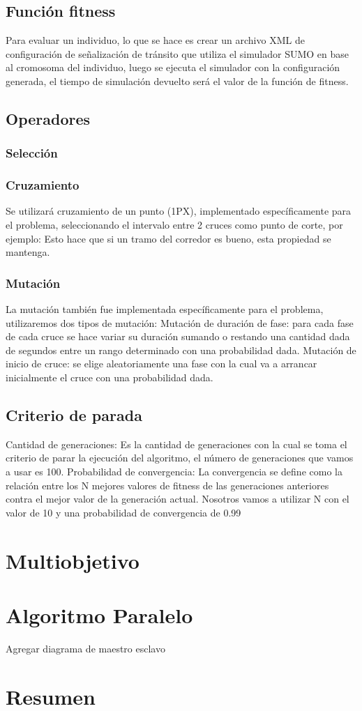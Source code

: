 \subsection{Función fitness}
Para evaluar un individuo, lo que se hace es crear un archivo
XML  de configuración de señalización de tránsito que utiliza
el  simulador  SUMO  en  base  al  cromosoma  del  individuo,
luego se ejecuta el simulador con la configuración generada, el
tiempo de simulación devuelto será el valor de la función de
fitness.

\subsection{Operadores}
\subsubsection{Selección}
\subsubsection{Cruzamiento}
Se  utilizará  cruzamiento  de  un  punto  (1PX),  implementado
específicamente  para  el  problema,  seleccionando  el  intervalo
entre 2 cruces como punto de corte, por ejemplo:
Esto  hace  que  si  un  tramo  del  corredor  es  bueno,  esta
propiedad se mantenga.

\subsubsection{Mutación}
La  mutación también fue  implementada  específicamente para
el problema, utilizaremos dos tipos de mutación:
Mutación de duración de fase: para cada fase de cada cruce se
hace variar su duración sumando o restando una cantidad dada
de segundos entre un rango determinado con una probabilidad
dada.
Mutación de inicio de cruce: se elige aleatoriamente una fase
con  la  cual  va  a  arrancar  inicialmente  el  cruce  con  una
probabilidad dada.

\subsection{Criterio de parada}
 Cantidad  de  generaciones:  Es  la  cantidad  de
 generaciones  con  la  cual  se  toma  el  criterio  de  parar  la
 ejecución del algoritmo, el número de generaciones que vamos
 a usar es 100.
 Probabilidad  de  convergencia:  La  convergencia  se
 define como la relación entre los N mejores valores de fitness
 de  las  generaciones  anteriores  contra  el  mejor  valor  de  la
 generación actual. Nosotros vamos a utilizar N con el valor de
 10 y una probabilidad de convergencia de 0.99




\section{Multiobjetivo}

\section{Algoritmo Paralelo}
Agregar diagrama de maestro esclavo



\section{Resumen}